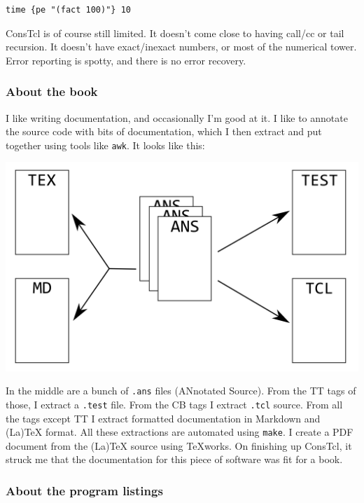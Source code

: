 \documentclass[twoside,9pt]{report}
\begin{document}
\begin{verbatim}
time {pe "(fact 100)"} 10
\end{verbatim}

ConsTcl is of course still limited. It doesn't come close to having call/cc or
tail recursion. It doesn't have exact/inexact numbers, or most of the numerical
tower. Error reporting is spotty, and there is no error recovery.

\subsubsection{About the book}
\label{about-the-book}


I like writing documentation, and occasionally I'm good at it. I like to
annotate the source code with bits of documentation, which I then extract and
put together using tools like \texttt{awk}. It looks like this:

\includegraphics{images/document.png}

In the middle are a bunch of \texttt{.ans} files (ANnotated Source). From the
TT tags of those, I extract a \texttt{.test} file. From the CB tags I extract
\texttt{.tcl} source. From all the tags except TT I extract formatted
documentation in Markdown and (La)TeX format. All these extractions are
automated using \texttt{make}. I create a PDF document from the (La)TeX source
using TeXworks. On finishing up ConsTcl, it struck me that the documentation
for this piece of software was fit for a book.

\subsubsection{About the program listings}
\label{about-the-program-listings}
\end{document}
